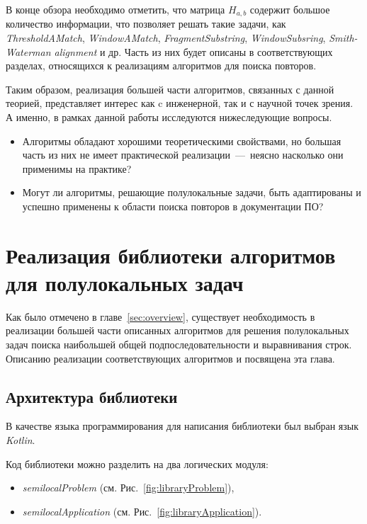 В конце обзора необходимо отметить, что матрица $H_{a,b}$ содержит большое количество информации, что позволяет решать такие задачи, как \emph{ThresholdAMatch}, \emph{WindowAMatch}, \emph{FragmentSubstring}, \emph{WindowSubsring}, \emph{Smith-Waterman alignment} и др. 
Часть из них будет описаны в соответствующих разделах, относящихся к реализациям алгоритмов для поиска повторов.

Таким образом, реализация большей части алгоритмов, связанных с данной теорией, представляет интерес как c инженерной, так и с научной точек зрения.
А именно, в рамках данной работы исследуются нижеследующие вопросы.
\begin{itemize}
\item Алгоритмы обладают хорошими теоретическими свойствами, но большая часть из них не имеет практической реализации~---~неясно насколько они применимы на практике?
\item Могут ли алгоритмы, решающие полулокальные задачи, быть адаптированы и успешно применены к области поиска повторов в документации ПО?
\end{itemize}



\section{Реализация библиотеки алгоритмов для полулокальных задач}\label{librarySection}
Как было отмечено %
в главе~\ref{sec:overview},
существует необходимость в реализации большей части описанных алгоритмов для решения полулокальных задач поиска наибольшей общей подпоследовательности и выравнивания строк.
Описанию реализации соответствующих алгоритмов и посвящена эта глава.


\subsection{Архитектура библиотеки}
В качестве языка программирования для написания библиотеки был выбран язык \emph{Kotlin}.

Код библиотеки можно  разделить на два логических модуля:
\begin{itemize}
    \item \emph{semilocalProblem}  (см. Рис.~\ref{fig:libraryProblem}),
    \item \emph{semilocalApplication} (см. Рис.~\ref{fig:libraryApplication}).
\end{itemize}


